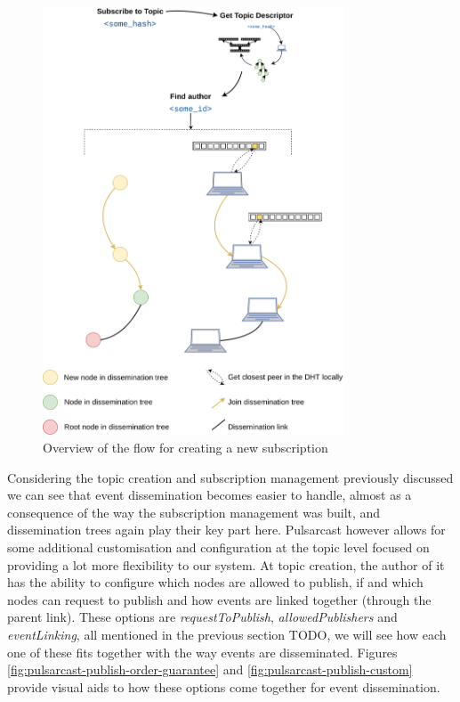 \begin{figure}[hb!]
  \centering
  \includegraphics[width=0.8\textwidth]{img/pulsarcast-subscription-flow.png}
  \caption{Overview of the flow for creating a new subscription}
  \label{fig:pulsarcast-subscription-flow}
\end{figure}

Considering the topic creation and subscription management previously discussed
we can see that event dissemination becomes easier to handle, almost as a
consequence of the way the subscription management was built, and dissemination
trees again play their key part here. Pulsarcast however allows for some
additional customisation and configuration at the topic level focused on
providing a lot more flexibility to our system. At topic creation, the author
of it has the ability to configure which nodes are allowed to publish, if and
which nodes can request to publish and how events are linked together (through
the parent link). These options are \emph{requestToPublish},
\emph{allowedPublishers} and \emph{eventLinking}, all mentioned in the previous
section TODO, we will see how each one of these fits together with the way
events are disseminated. Figures \ref{fig:pulsarcast-publish-order-guarantee}
and \ref{fig:pulsarcast-publish-custom} provide visual aids to how these
options come together for event dissemination.

